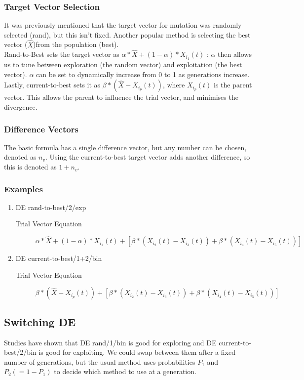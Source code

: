 \subsubsection{Target Vector Selection}
It was previously mentioned that the target vector for mutation was randomly selected (rand), but this isn't fixed. Another popular method is selecting the best vector ($\hat{X}$)from the population (best).\\
Rand-to-Best sets the target vector as \(\alpha*\hat{X} + (1-\alpha) * X_{i_1}(t)  \) : $\alpha$ then allows us to tune between exploration (the random vector) and exploitation (the best vector). $\alpha$ can be set to dynamically increase from 0 to 1 as generations increase.\\
Lastly, current-to-best sets it as \(\beta * (\hat{X} - X_{i_p}(t)) \), where $X_{i_p}(t)$ is the parent vector. This allows the parent to influence the trial vector, and minimises the divergence.

\subsubsection{Difference Vectors}
The basic formula has a single difference vector, but any number can be chosen, denoted as $n_v$. Using the current-to-best target vector adds another difference, so this is denoted as $1+n_v$.

\subsubsection{Examples}
\begin{enumerate}
    \item DE rand-to-best/2/exp
    \begin{description}
    \item [Trial Vector Equation] \(\alpha*\hat{X} + (1-\alpha) * X_{i_1}(t) + [\beta * (X_{i_2}(t) - X_{i_3}(t)) + \beta * (X_{i_4}(t) - X_{i_5}(t))] \)
    \end{description}
    
    \item DE current-to-best/1+2/bin
    \begin{description}
    \item [Trial Vector Equation] \(\beta * (\hat{X} - X_{i_p}(t)) + [\beta * (X_{i_2}(t) - X_{i_3}(t)) + \beta * (X_{i_4}(t) - X_{i_5}(t))]\)
    \end{description}
\end{enumerate}

\subsection{Switching DE}
Studies have shown that DE rand/1/bin is good for exploring and DE current-to-best/2/bin is good for exploiting. We could swap between them after a fixed number of generations, but the usual method uses probabilities $P_1$ and $P_2 (= 1-P_1)$ to decide which method to use at a generation.

